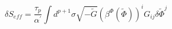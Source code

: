 \begin{equation}
\delta S_{eff}=\frac{\tau_p}{\alpha^\prime}\int
d^{p+1}\sigma\sqrt{-\tilde G}(\beta^\Phi(\tilde\Phi))^i G_{i
j}\delta\tilde\Phi^j
\end{equation}


